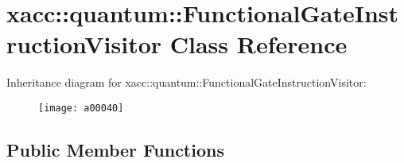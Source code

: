 \hypertarget{a00040}{}\section{xacc\+:\+:quantum\+:\+:Functional\+Gate\+Instruction\+Visitor Class Reference}
\label{a00040}
Inheritance diagram for xacc\+:\+:quantum\+:\+:Functional\+Gate\+Instruction\+Visitor\+:\begin{figure}[H]
\begin{center}
\leavevmode
\texttt{[image: a00040]}
\end{center}
\end{figure}
\subsection*{Public Member Functions}
